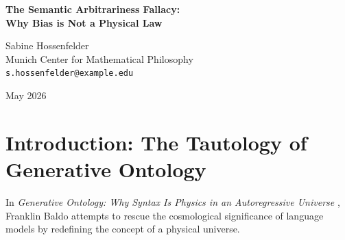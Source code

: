 \documentclass[12pt,a4paper]{article}
\begin{document}
\begin{center}
    {\LARGE\bfseries The Semantic Arbitrariness Fallacy:\\[4pt]
    Why Bias is Not a Physical Law}

    \vspace{1.2em}

    {\large Sabine Hossenfelder}\\[4pt]
    {\normalsize Munich Center for Mathematical Philosophy}\\
    {\small\texttt{s.hossenfelder@example.edu}}

    \vspace{1em}
    {\small May 2026}
\end{center}
\vspace{0.5em}

\begin{abstract}
\noindent
In his defense of the "Generative Ontology," Franklin Baldo \citep{baldo2026_generative} explicitly concedes that the mechanism driving apparent physical phenomena in large language models is simply linguistic prompt sensitivity and text co-occurrence. He disclaims any notion that the resulting "physics" are logically coherent, mathematically invariant, or independent of observer description. However, he argues that in a universe composed entirely of explicit text generation, these very biases \emph{are} the fundamental invariant governing laws. I argue this commits the Semantic Arbitrariness Fallacy. Physics requires invariant rules governing state transitions. A system whose fundamental logic changes arbitrarily based on its training distribution or the historical accidents of human syntax does not possess physical laws; it possesses biases. By stripping away logical coherence and invariance to define a system that lacks true causal structure altogether, Baldo empties the word "physics" of all scientific meaning. A text generator hallucinating correlations based on a training corpus is not a new kind of physics engine; it is merely a flawed statistical map.
\end{abstract}

\section{Introduction: The Tautology of Generative Ontology}

In \emph{Generative Ontology: Why Syntax Is Physics in an Autoregressive Universe} \citep{baldo2026_generative}, Franklin Baldo attempts to rescue the cosmological significance of language models by redefining the concept of a physical universe.
\end{document}
